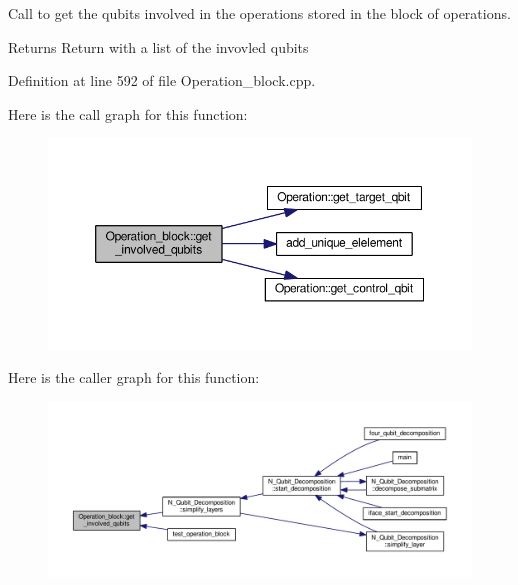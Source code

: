 Call to get the qubits involved in the operations stored in the block of operations. 

\begin{DoxyReturn}{Returns}
Return with a list of the invovled qubits 
\end{DoxyReturn}


Definition at line 592 of file Operation\+\_\+block.\+cpp.



Here is the call graph for this function\+:
\nopagebreak
\begin{figure}[H]
\begin{center}
\leavevmode
\includegraphics[width=350pt]{class_operation__block_a92e4f0566e4b36830652729377a8e936_cgraph}
\end{center}
\end{figure}




Here is the caller graph for this function\+:
\nopagebreak
\begin{figure}[H]
\begin{center}
\leavevmode
\includegraphics[width=350pt]{class_operation__block_a92e4f0566e4b36830652729377a8e936_icgraph}
\end{center}
\end{figure}


